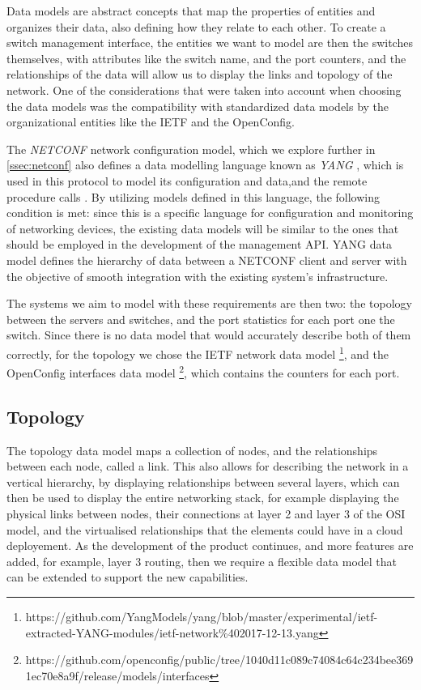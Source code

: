 Data models are abstract concepts that map the properties of entities and organizes their data, also defining how they relate to each other. To create a switch management interface, the entities we want to model are then 
the switches themselves, with attributes like the switch name, and the port counters, and the relationships of the data will allow us to display the links and topology of the network. One of the considerations that were taken into 
account when choosing the data models was the compatibility with standardized data models by the organizational entities like the IETF and the OpenConfig. 
\par The \textit{ NETCONF } network configuration model, which we explore further in \ref{ssec:netconf} also defines a data modelling language known as \textit{ YANG }, which is used in this protocol to model its configuration 
and data,and the remote procedure calls \cite { CITE - rfc 6020 }. By utilizing models defined in this language, the following condition is met: since this is a specific language for configuration and monitoring of networking 
devices, the existing data models will be similar to the ones that should be employed in the development of the management API. YANG data model defines the hierarchy of data between a NETCONF client and server with the objective
of smooth integration with the existing system's infrastructure. 
\par The systems we aim to model with these requirements are then two: the topology between the servers and switches, and the port statistics for each port one the switch. Since there is no data model that would accurately describe
both of them correctly, for the topology we chose the IETF network data model \footnote {https://github.com/YangModels/yang/blob/master/experimental/ietf-extracted-YANG-modules/ietf-network\%402017-12-13.yang}, and the 
OpenConfig interfaces data model \footnote {https://github.com/openconfig/public/tree/1040d11c089c74084c64c234bee3691ec70e8a9f/release/models/interfaces}, which contains the counters for each port.

\subsection {Topology}

The topology data model maps a collection of nodes, and the relationships between each node, called a link. This also allows for describing the network in a vertical hierarchy, by displaying relationships between several layers,
which can then be used to display the entire networking stack, for example displaying the physical links between nodes, their connections at layer 2 and layer 3 of the OSI model, and the virtualised relationships that the elements 
could have in a cloud deployement. As the development of the product continues, and more features are added, for example, layer 3 routing, then we require a flexible data model that can be extended to support the new capabilities.

